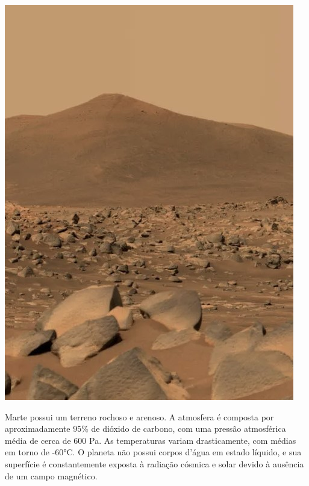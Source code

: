 \documentclass[./main.tex]{subfiles}
\begin{document}
\nolinenumbers

\newpage
\renewcommand{\headrulewidth}{0pt}
\thispagestyle{fancy}
\fancyhf{} %
\fancyfoot{} %
\fancyfoot[C]{\thepage}

\par \hfill
\vspace{40mm}
\begin{adjustwidth}{45pt}{45pt}
\begin{center}
    \includegraphics[scale=0.7]{figs/mars.jpg}\\
\end{center}
\vspace{10mm}
\noindent \textsf{Marte possui um terreno rochoso e arenoso. A atmosfera é composta por aproximadamente 95\% de dióxido de carbono, com uma pressão atmosférica média de cerca de 600 Pa. As temperaturas variam drasticamente, com médias em torno de -60°C. O planeta não possui corpos d'água em estado líquido, e sua superfície é constantemente exposta à radiação cósmica e solar devido à ausência de um campo magnético.}
\end{adjustwidth}
\clearpage
\end{document}
